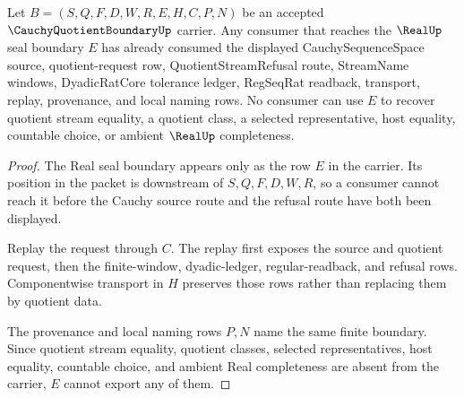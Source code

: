 \begin{theorem}\label{thm:cauchy-quotient-boundary-real-seal-nonescape}
Let $B=(S,Q,F,D,W,R,E,H,C,P,N)$ be an accepted $\CauchyQuotientBoundaryUp$ carrier. Any consumer that reaches the $\RealUp$ seal boundary $E$ has already consumed the displayed CauchySequenceSpace source, quotient-request row, QuotientStreamRefusal route, StreamName windows, DyadicRatCore tolerance ledger, RegSeqRat readback, transport, replay, provenance, and local naming rows. No consumer can use $E$ to recover quotient stream equality, a quotient class, a selected representative, host equality, countable choice, or ambient $\RealUp$ completeness.
\end{theorem}
\begin{proof}
The Real seal boundary appears only as the row $E$ in the carrier. Its position in the packet is downstream of $S,Q,F,D,W,R$, so a consumer cannot reach it before the Cauchy source route and the refusal route have both been displayed.

Replay the request through $C$. The replay first exposes the source and quotient request, then the finite-window, dyadic-ledger, regular-readback, and refusal rows. Componentwise transport in $H$ preserves those rows rather than replacing them by quotient data.

The provenance and local naming rows $P,N$ name the same finite boundary. Since quotient stream equality, quotient classes, selected representatives, host equality, countable choice, and ambient Real completeness are absent from the carrier, $E$ cannot export any of them.
\end{proof}

